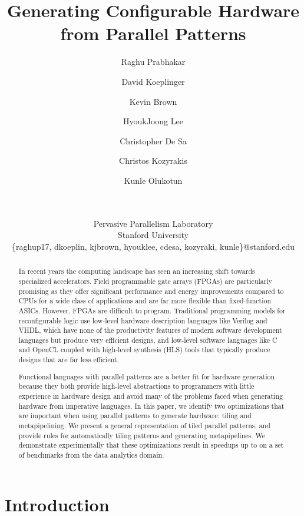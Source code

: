 \documentclass[pageno]{jpaper}
\author{
  Raghu Prabhakar \and David Koeplinger \and Kevin Brown \and HyoukJoong Lee \\
  \and Christopher De Sa \and Christos Kozyrakis \and Kunle Olukotun \and \\
  \vspace{-0.35in}\\
  \small Pervasive Parallelism Laboratory \vspace{-0.02in}\\
  \small Stanford University\\
  \small \{raghup17, dkoeplin, kjbrown, hyouklee, cdesa, kozyraki, kunle\}@stanford.edu\\
}
\begin{document}
\title{Generating Configurable Hardware from Parallel Patterns }

\date{}
\maketitle

\thispagestyle{empty}

\begin{abstract}
In recent years the computing landscape has seen an increasing shift towards specialized accelerators. Field programmable gate arrays (FPGAs) are particularly promising as they offer significant performance and energy improvements compared to CPUs for a wide class of applications and are far more flexible than fixed-function ASICs. However, FPGAs are difficult to program. Traditional programming models for reconfigurable logic use low-level hardware description languages like Verilog and VHDL, which have none of the productivity features of modern software development languages but produce very efficient designs, and low-level software languages like C and OpenCL coupled with high-level synthesis (HLS) tools that typically produce designs that are far less efficient.

Functional languages with parallel patterns are a better fit for hardware generation because they both provide high-level abstractions
to programmers with little experience in hardware design and avoid many of the problems faced when generating hardware from imperative languages.  In this paper, we identify two optimizations that are important when using parallel patterns to generate hardware:
tiling and metapipelining.  We present a general representation of tiled parallel patterns, and provide rules for
automatically tiling patterns and generating metapipelines.
We demonstrate experimentally that these optimizations result in speedups up to
 on a set of benchmarks from the data analytics domain.
 \end{abstract}

\section{Introduction}
\label{intro}
\end{document}
